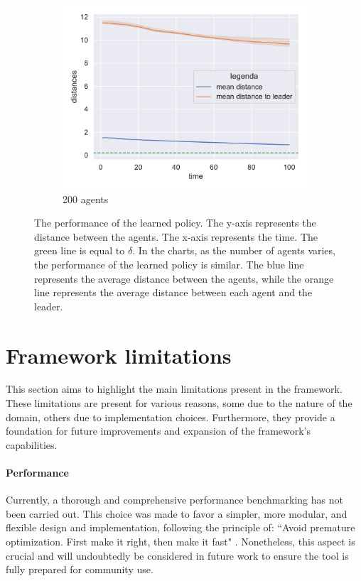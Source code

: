\documentclass[12pt,a4paper,openright,twoside]{book}
\begin{document}
\begin{figure}[h!]
\begin{subfigure}[b]{0.32\textwidth}
        \includegraphics[width=\textwidth]{figures/data-ftl-200.pdf}
        \caption{200 agents}
    \end{subfigure}
\caption{The performance of the learned policy. 
The y-axis represents the distance between the agents.
The x-axis represents the time.
The green line is equal to $\delta$.
In the charts, as the number of agents varies, the performance of the learned policy is similar.
The blue line represents the average distance between the agents, while the orange line represents
the average distance between each agent and the leader.
}
\label{fig:test-ftl}
\end{figure}

\section{Framework limitations}
This section aims to highlight the main limitations present in the framework. These limitations are
 present for various reasons, some due to the nature of the domain, others due to implementation choices. 
 Furthermore, they provide a foundation for future improvements and expansion of the framework's capabilities.

\paragraph{Performance} 
Currently, a thorough and comprehensive performance benchmarking has not been carried out. This choice was made to 
    favor a simpler, more modular, and flexible design and implementation, following the principle of:
    ``Avoid premature optimization. First make it right, then make it fast" \cite{hyde2006fallacy}.
    Nonetheless, this aspect is crucial and will undoubtedly be considered in future work to ensure the tool is 
    fully prepared for community use.
\end{document}
